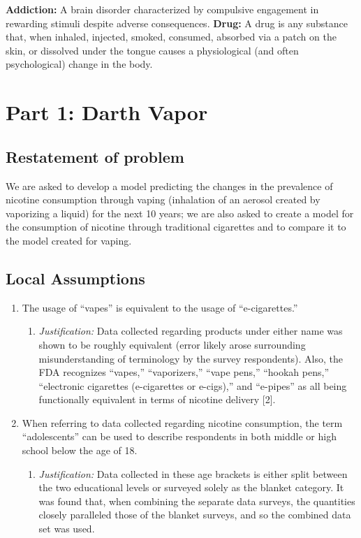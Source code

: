 \textbf{Addiction:} A brain disorder characterized by compulsive engagement in rewarding stimuli despite adverse consequences.
\newline
\textbf{Drug:} A drug is any substance that, when inhaled, injected, smoked, consumed, absorbed via a patch on the skin, or dissolved under the tongue causes a physiological (and often psychological) change in the body.

\section*{Part 1: Darth Vapor}
\setcounter{section}{1}
\subsection{Restatement of problem}
We are asked to develop a model predicting the changes in the prevalence of nicotine consumption through vaping (inhalation of an aerosol created by vaporizing a liquid) for the next 10 years; we are also asked to create a model for the consumption of nicotine through traditional cigarettes and to compare it to the model created for vaping.

\subsection{Local Assumptions}
\begin{enumerate}
    \item The usage of “vapes” is equivalent to the usage of “e-cigarettes.”
    \begin{enumerate}
        \item \textit{Justification:} Data collected regarding products under either name was shown to be roughly equivalent (error likely arose surrounding misunderstanding of terminology by the survey respondents). Also, the FDA recognizes “vapes,” “vaporizers,” “vape pens,” “hookah pens,” “electronic cigarettes (e-cigarettes or e-cigs),” and “e-pipes” as all being functionally equivalent in terms of nicotine delivery [2].
    \end{enumerate}
    \item When referring to data collected regarding nicotine consumption, the term “adolescents” can be used to describe respondents in both middle or high school below the age of 18.
    \begin{enumerate}
        \item \textit{Justification:} Data collected in these age brackets is either split between the two educational levels or surveyed solely as the blanket category. It was found that, when combining the separate data surveys, the quantities closely paralleled those of the blanket surveys, and so the combined data set was used.
    \end{enumerate}
\end{enumerate}

